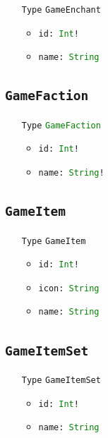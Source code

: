 \documentclass[10pt, a4paper]{memoir}
\numberwithin{equation}{section}
\theoremstyle{plain}
\theoremstyle{defp}
\theoremstyle{dotless}
\theoremstyle{definition}
\theoremstyle{dotless}
\theoremstyle{dotless}
\theoremstyle{defp}
\theoremstyle{defp}
\theoremstyle{be}          %
\theoremstyle{defp}
\newcommand\ttt[1]{\texttt{#1}}
\newcommand\type[1]{\ttt{\textcolor{green}{#1}}}
\begin{document}
\begin{itemize}[noitemsep,topsep=1pt]
\item[\ttt{Type}] \ttt{GameEnchant}
\begin{itemize}[itemsep=1pt,topsep=1pt]
\item \ttt{id: \type{Int}!}
\item \ttt{name: \type{String}}
\end{itemize}
\end{itemize}

\subsection{\ttt{GameFaction}}\label{sec:GameFaction}

\begin{itemize}[noitemsep,topsep=1pt]
\item[\ttt{Type}] \type{GameFaction}
\begin{itemize}[itemsep=1pt,topsep=1pt]
\item \ttt{id: \type{Int}!}
\item \ttt{name: \type{String}!}
\end{itemize}
\end{itemize}

\subsection{\ttt{GameItem}}\label{sec:GameItem}

\begin{itemize}[noitemsep,topsep=1pt]
\item[\ttt{Type}] \ttt{GameItem}
\begin{itemize}[itemsep=1pt,topsep=1pt]
\item \ttt{id: \type{Int}!}
\item \ttt{icon: \type{String}}
\item \ttt{name: \type{String}}
\end{itemize}
\end{itemize}

\subsection{\ttt{GameItemSet}}\label{sec:GameItemSet}

\begin{itemize}[noitemsep,topsep=1pt]
\item[\ttt{Type}] \ttt{GameItemSet}
\begin{itemize}[itemsep=1pt,topsep=1pt]
\item \ttt{id: \type{Int}!}
\item \ttt{name: \type{String}}
\end{itemize}
\end{itemize}
\end{document}
